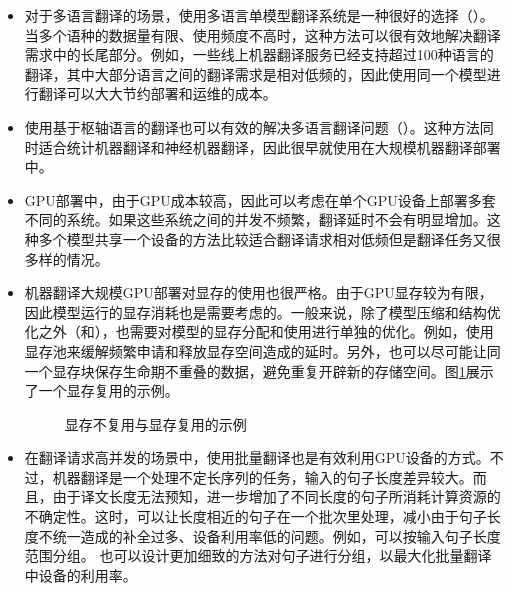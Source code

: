 \begin{itemize}
\vspace{0.5em}
\item 对于多语言翻译的场景，使用多语言单模型翻译系统是一种很好的选择（{\chaptersixteen}）。当多个语种的数据量有限、使用频度不高时，这种方法可以很有效地解决翻译需求中的长尾部分。例如，一些线上机器翻译服务已经支持超过100种语言的翻译，其中大部分语言之间的翻译需求是相对低频的，因此使用同一个模型进行翻译可以大大节约部署和运维的成本。

\vspace{0.5em}
\item 使用基于枢轴语言的翻译也可以有效的解决多语言翻译问题（{\chaptersixteen}）。这种方法同时适合统计机器翻译和神经机器翻译，因此很早就使用在大规模机器翻译部署中。

\vspace{0.5em}
\item GPU部署中，由于GPU成本较高，因此可以考虑在单个GPU设备上部署多套不同的系统。如果这些系统之间的并发不频繁，翻译延时不会有明显增加。这种多个模型共享一个设备的方法比较适合翻译请求相对低频但是翻译任务又很多样的情况。

\vspace{0.5em}
\item 机器翻译大规模GPU部署对显存的使用也很严格。由于GPU显存较为有限，因此模型运行的显存消耗也是需要考虑的。一般来说，除了模型压缩和结构优化之外（{\chapterfourteen}和{\chapterfifteen}），也需要对模型的显存分配和使用进行单独的优化。例如，使用显存池来缓解频繁申请和释放显存空间造成的延时。另外，也可以尽可能让同一个显存块保存生命期不重叠的数据，避免重复开辟新的存储空间。图\ref{fig:18-4}展示了一个显存复用的示例。

\begin{figure}[htp]
\centering

\caption{显存不复用与显存复用的示例}
\label{fig:18-4}
\end{figure}
\vspace{0.5em}
\item 在翻译请求高并发的场景中，使用批量翻译也是有效利用GPU设备的方式。不过，机器翻译是一个处理不定长序列的任务，输入的句子长度差异较大。而且，由于译文长度无法预知，进一步增加了不同长度的句子所消耗计算资源的不确定性。这时，可以让长度相近的句子在一个批次里处理，减小由于句子长度不统一造成的补全过多、设备利用率低的问题。例如，可以按输入句子长度范围分组。 也可以设计更加细致的方法对句子进行分组，以最大化批量翻译中设备的利用率。

\vspace{0.5em}
\end{itemize}

